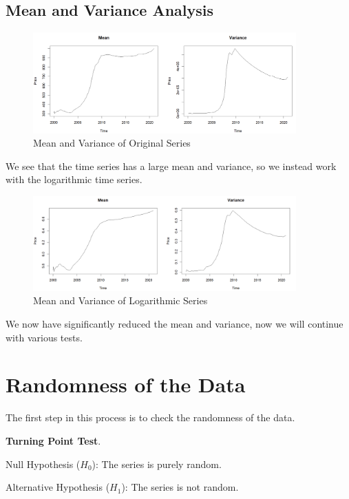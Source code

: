 \documentclass{article}
\begin{document}
\subsection{Mean and Variance Analysis}
\begin{figure}[h]
    \centering
    \includegraphics[width=0.9\textwidth]{MeanVarianceBefore.png}
    \caption{Mean and Variance of Original Series}
    \label{fig:Label2}
\end{figure}

We see that the time series has a large mean and variance, so we instead work with the logarithmic time series.

\begin{figure}[h]
    \centering
    \includegraphics[width=0.9\textwidth]{MeanVarianceAfter.png}
    \caption{Mean and Variance of Logarithmic Series}
    \label{fig:Label3}
\end{figure}

We now have significantly reduced the mean and variance, now we will continue with various tests.

\section{Randomness of the Data}
The first step in this process is to check the randomness of the data.

\begin{center}
    \textbf{Turning Point Test}.
    
    Null Hypothesis (\(H_0\)): The series is purely random.
    
    Alternative Hypothesis (\(H_1\)): The series is not random.
\end{center}
\end{document}
